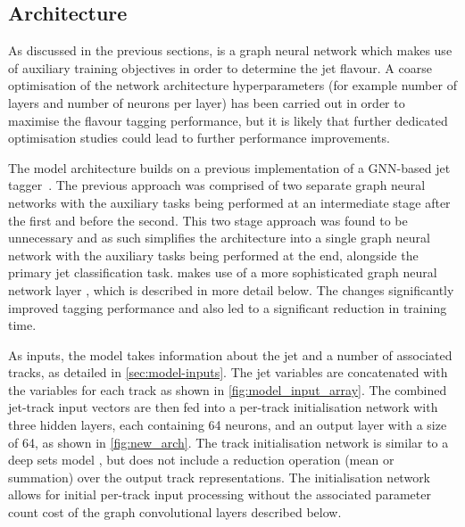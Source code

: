 \subsection{Architecture}\label{sec:Architecture}

As discussed in the previous sections, \GNN is a graph neural network which makes use of auxiliary training objectives in order to determine the jet flavour.
A coarse optimisation of the network architecture hyperparameters (for example number of layers and number of neurons per layer) has been carried out in order to maximise the flavour tagging performance, but it is likely that further dedicated optimisation studies could lead to further performance improvements. 

The model architecture builds on a previous implementation of a GNN-based jet tagger~\cite{serviansky2020set2graph}.
The previous approach was comprised of two separate graph neural networks with the auxiliary tasks being performed at an intermediate stage after the first and before the second.
This two stage approach was found to be unnecessary and as such \GNN simplifies the architecture into a single graph neural network with the auxiliary tasks being performed at the end, alongside the primary jet classification task.
\GNN makes use of a more sophisticated graph neural network layer \cite{2021arXiv210514491B}, which is described in more detail below.
The changes significantly improved tagging performance and also led to a significant reduction in training time.

As inputs, the model takes information about the jet and a number of associated tracks, as detailed in \cref{sec:model-inputs}.
The jet variables are concatenated with the variables for each track as shown in \cref{fig:model_input_array}.
The combined jet-track input vectors are then fed into a per-track initialisation network with three hidden layers, each containing 64 neurons, and an output layer with a size of 64, as shown in \cref{fig:new_arch}. 
The track initialisation network is similar to a deep sets model \cite{zaheer2018deep}, but does not include a reduction operation (mean or summation) over the output track representations.
The initialisation network allows for initial per-track input processing without the associated parameter count cost of the graph convolutional layers described below. 

